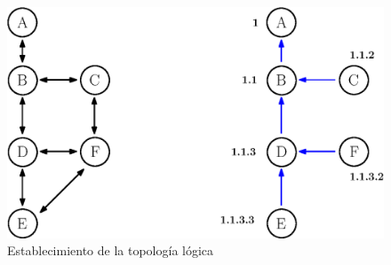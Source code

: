 \begin{figure}[ht]
    \centering
    \includegraphics[width=\textwidth]{archivos/img/dev/topo_logic.eps}
    \caption{Establecimiento de la topología lógica}
    \label{fig:topo_logic}
\end{figure}

